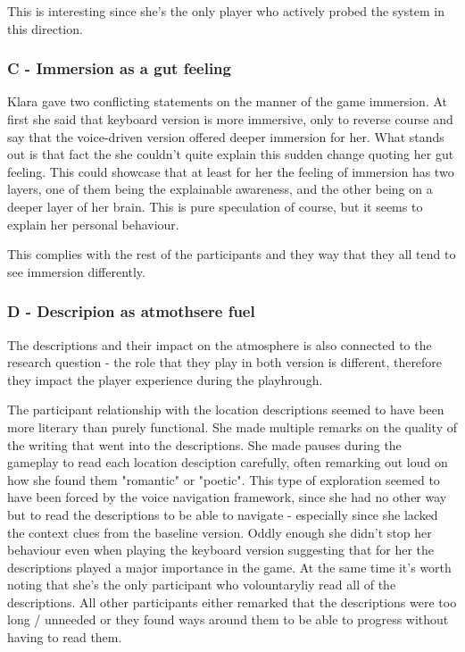 This is interesting since she's the only player who actively probed the system in this direction. 

\subsubsection{C - Immersion as a gut feeling}


Klara gave two conflicting statements on the manner of the game immersion. At first she said that keyboard version is more immersive, only to reverse course and say that the voice-driven version offered deeper immersion for her. What stands out is that fact the she couldn't quite explain this sudden change quoting her gut feeling. This could showcase that at least for her the feeling of immersion has two layers, one of them being the explainable awareness, and the other being on a deeper layer of her brain. This is pure speculation of course, but it seems to explain her personal behaviour.

This complies with the rest of the participants and they way that they all tend to see immersion differently.



\subsubsection{D - Descripion as atmothsere fuel}


The descriptions and their impact on the atmosphere is also connected to the research question - the role that they play in both version is different, therefore they impact the player experience during the playhrough.

The participant relationship with the location descriptions seemed to have been more literary than purely functional. She made multiple remarks on the quality of the writing that went into the descriptions. She made pauses during the gameplay to read each location desciption carefully, often remarking out loud on how she found them "romantic" or "poetic". This type of exploration seemed to have been forced by the voice navigation framework, since she had no other way but to read the descriptions to be able to navigate - especially since she lacked the context clues from the baseline version. Oddly enough she didn't stop her behaviour even when playing the keyboard version suggesting that for her the descriptions played a major importance in the game. At the same time it's worth noting that she's the only participant who volountaryliy read all of the descriptions. All other participants either remarked that the descriptions were too long / unneeded or they found ways around them to be able to progress without having to read them. 

